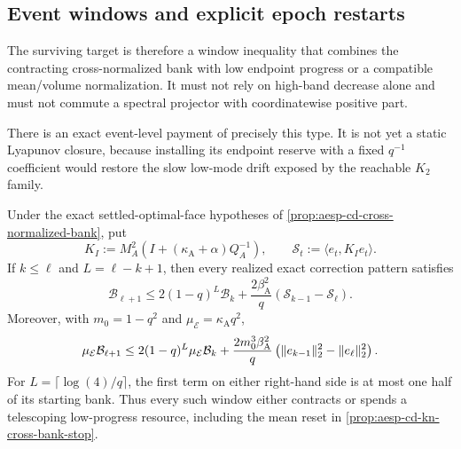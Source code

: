 \subsection{Event windows and explicit epoch restarts}

The surviving target is therefore a window inequality that combines the
contracting cross-normalized bank with low endpoint progress or a compatible
mean/volume normalization.  It must not rely on high-band decrease alone and
must not commute a spectral projector with coordinatewise positive part.

There is an exact event-level payment of precisely this type.  It is not yet
a static Lyapunov closure, because installing its endpoint reserve with a
fixed $q^{-1}$ coefficient would restore the slow low-mode drift exposed by
the reachable $K_2$ family.

\begin{proposition}
\label{prop:aesp-cd-cross-normalized-contract-spend}
Under the exact settled-optimal-face hypotheses of
\cref{prop:aesp-cd-cross-normalized-bank}, put
\begin{equation}
 K_I:=M_A^2\left(I+(\kappa_{\mathrm A}+\alpha)Q_A^{-1}\right),
 \qquad
 \mathcal S_t:=\langle e_t,K_Ie_t\rangle.
 \label{eq:aesp-cd-cross-normalized-spend-bank}
\end{equation}
If $k\leq\ell$ and $L=\ell-k+1$, then every realized exact correction
pattern satisfies
\begin{equation}
 \mathcal B_{\ell+1}
 \leq2(1-q)^L\mathcal B_k
 +\frac{2\beta_{\mathrm A}^2}{q}
   (\mathcal S_{k-1}-\mathcal S_\ell).
 \label{eq:aesp-cd-cross-normalized-contract-spend}
\end{equation}
Moreover, with $m_0=1-q^2$ and
$\mu_{\mathcal E}=\kappa_{\mathrm A}q^2$,
\begin{equation}
 \mu_{\mathcal E}\mathcal B_{\ell+1}
 \leq2(1-q)^L\mu_{\mathcal E}\mathcal B_k
 +\frac{2m_0^3\beta_{\mathrm A}^2}{q}
  \left(\lVert e_{k-1}\rVert_2^2-\lVert e_\ell\rVert_2^2\right).
 \label{eq:aesp-cd-cross-normalized-low-spend}
\end{equation}
For $L=\lceil\log(4)/q\rceil$, the first term on either right-hand side is
at most one half of its starting bank.  Thus every such window either
contracts or spends a telescoping low-progress resource, including the mean
reset in \cref{prop:aesp-cd-kn-cross-bank-stop}.
\end{proposition}

